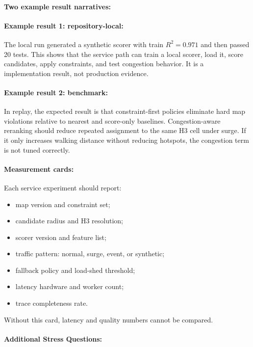 \documentclass{article}
\begin{document}
\paragraph{Two example result narratives:}

\paragraph{Example result 1: repository-local:}
The local run generated a synthetic scorer with train $R^2=0.971$ and then passed 20 tests. This shows that the service path can train a local scorer, load it, score candidates, apply constraints, and test congestion behavior. It is a implementation result, not production evidence.

\paragraph{Example result 2: benchmark:}
In replay, the expected result is that constraint-first policies eliminate hard map violations relative to nearest and score-only baselines. Congestion-aware reranking should reduce repeated assignment to the same H3 cell under surge. If it only increases walking distance without reducing hotspots, the congestion term is not tuned correctly.

\paragraph{Measurement cards:}

Each service experiment should report:
\begin{itemize}
  \item map version and constraint set;
  \item candidate radius and H3 resolution;
  \item scorer version and feature list;
  \item traffic pattern: normal, surge, event, or synthetic;
  \item fallback policy and load-shed threshold;
  \item latency hardware and worker count;
  \item trace completeness rate.
\end{itemize}
Without this card, latency and quality numbers cannot be compared.

\paragraph{Additional Stress Questions:}
\end{document}
